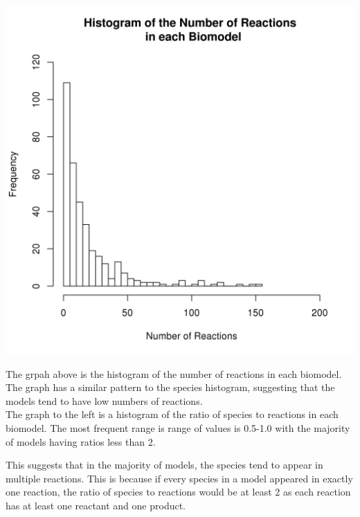\documentclass[portrait,a0paper,fontscale=0.35]{baposter}
\begin{document}
\begin{poster}
{\begin{multicols}{2}
 \includegraphics[trim= 1.5mm 5mm 5mm 5mm, clip, scale=0.4]{Poster-images/ReactionsHistogram.png} 
  
  The grpah above is the histogram of the number of reactions in each biomodel. The graph has a similar pattern to the species histogram, suggesting that the models tend to have low numbers of reactions.\\
   
 The graph to the left is a histogram of the ratio of species to reactions in each biomodel. The most frequent range is range of values is 0.5-1.0 with the majority of models having ratios less than 2.
 
 This suggests that in the majority of models, the species tend to appear in multiple reactions. This is because if every species in a model appeared in exactly one reaction, the ratio of species to reactions would be at least 2 as each reaction has at least one reactant and one product.
 
 \end{multicols}
 }
 
 
\end{poster}
\end{document}
